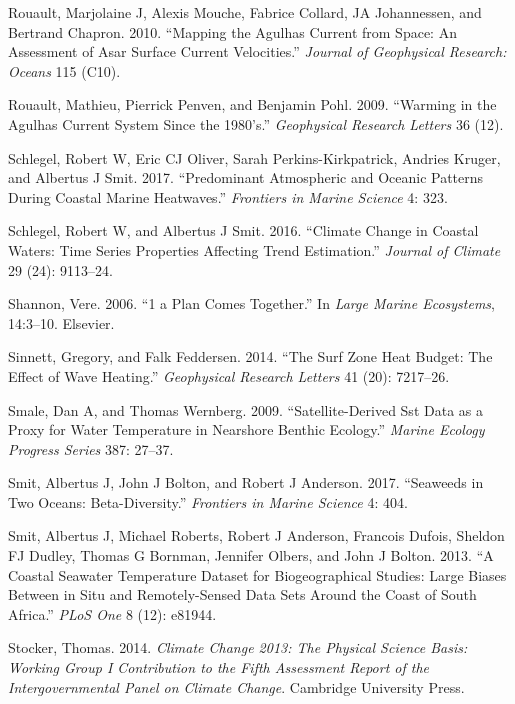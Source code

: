 \documentclass[12pt,a4paper,]{article}
\begin{document}
\leavevmode\hypertarget{ref-Rouault2010}{}%
Rouault, Marjolaine J, Alexis Mouche, Fabrice Collard, JA Johannessen,
and Bertrand Chapron. 2010. ``Mapping the Agulhas Current from Space: An
Assessment of Asar Surface Current Velocities.'' \emph{Journal of
Geophysical Research: Oceans} 115 (C10).

\leavevmode\hypertarget{ref-Rouault2009}{}%
Rouault, Mathieu, Pierrick Penven, and Benjamin Pohl. 2009. ``Warming in
the Agulhas Current System Since the 1980's.'' \emph{Geophysical
Research Letters} 36 (12).

\leavevmode\hypertarget{ref-Schlegel2017}{}%
Schlegel, Robert W, Eric CJ Oliver, Sarah Perkins-Kirkpatrick, Andries
Kruger, and Albertus J Smit. 2017. ``Predominant Atmospheric and Oceanic
Patterns During Coastal Marine Heatwaves.'' \emph{Frontiers in Marine
Science} 4: 323.

\leavevmode\hypertarget{ref-Schlegel2016}{}%
Schlegel, Robert W, and Albertus J Smit. 2016. ``Climate Change in
Coastal Waters: Time Series Properties Affecting Trend Estimation.''
\emph{Journal of Climate} 29 (24): 9113--24.

\leavevmode\hypertarget{ref-Shannon2006}{}%
Shannon, Vere. 2006. ``1 a Plan Comes Together.'' In \emph{Large Marine
Ecosystems}, 14:3--10. Elsevier.

\leavevmode\hypertarget{ref-Sinnett2014}{}%
Sinnett, Gregory, and Falk Feddersen. 2014. ``The Surf Zone Heat Budget:
The Effect of Wave Heating.'' \emph{Geophysical Research Letters} 41
(20): 7217--26.

\leavevmode\hypertarget{ref-Smale2009}{}%
Smale, Dan A, and Thomas Wernberg. 2009. ``Satellite-Derived Sst Data as
a Proxy for Water Temperature in Nearshore Benthic Ecology.''
\emph{Marine Ecology Progress Series} 387: 27--37.

\leavevmode\hypertarget{ref-Smit2017}{}%
Smit, Albertus J, John J Bolton, and Robert J Anderson. 2017. ``Seaweeds
in Two Oceans: Beta-Diversity.'' \emph{Frontiers in Marine Science} 4:
404.

\leavevmode\hypertarget{ref-Smit2013}{}%
Smit, Albertus J, Michael Roberts, Robert J Anderson, Francois Dufois,
Sheldon FJ Dudley, Thomas G Bornman, Jennifer Olbers, and John J Bolton.
2013. ``A Coastal Seawater Temperature Dataset for Biogeographical
Studies: Large Biases Between in Situ and Remotely-Sensed Data Sets
Around the Coast of South Africa.'' \emph{PLoS One} 8 (12): e81944.

\leavevmode\hypertarget{ref-Stocker2014}{}%
Stocker, Thomas. 2014. \emph{Climate Change 2013: The Physical Science
Basis: Working Group I Contribution to the Fifth Assessment Report of
the Intergovernmental Panel on Climate Change}. Cambridge University
Press.
\end{document}
